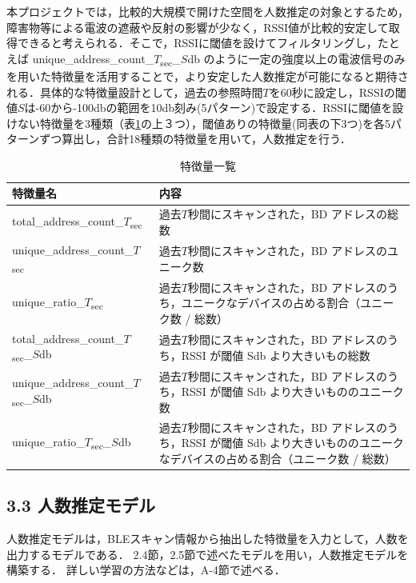 本プロジェクトでは，比較的大規模で開けた空間を人数推定の対象とするため，障害物等による電波の遮蔽や反射の影響が少なく，RSSI値が比較的安定して取得できると考えられる．そこで，RSSIに閾値を設けてフィルタリングし，たとえば unique\_address\_count\_$T$\textsubscript{sec}\_$S$db のように一定の強度以上の電波信号のみを用いた特徴量を活用することで，より安定した人数推定が可能になると期待される．具体的な特徴量設計として，過去の参照時間$T$を60秒に設定し，RSSIの閾値$S$は-60から-100dbの範囲を10db刻み(5パターン)で設定する．RSSIに閾値を設けない特徴量を3種類（表\ref{tbl:feastures}の上３つ），閾値ありの特徴量(同表の下3つ)を各5パターンずつ算出し，合計18種類の特徴量を用いて，人数推定を行う．

\begin{table}[tb]
	\centering
	\caption{特徴量一覧}
	\label{tbl:feastures}
	\small
	\doublerulesep=0.3pt
    \begin{tabular}{l|p{4cm}} \hline\hline\hline
		特徴量名 & 内容 \\ \hline
		total\_address\_count\_$T$\textsubscript{sec} & 過去$T$秒間にスキャンされた，BD アドレスの総数\\ \hline
		unique\_address\_count\_$T$\textsubscript{sec} & 過去$T$秒間にスキャンされた，BD アドレスのユニーク数 \\ \hline
		unique\_ratio\_$T$\textsubscript{sec} & 過去$T$秒間にスキャンされた，BD アドレスのうち，ユニークなデバイスの占める割合（ユニーク数 / 総数） \\ \hline
		total\_address\_count\_$T$\textsubscript{sec}\_$S$db & 過去$T$秒間にスキャンされた，BD アドレスのうち，RSSI が閾値 Sdb より大きいもの総数 \\ \hline
		unique\_address\_count\_$T$\textsubscript{sec}\_$S$db & 過去$T$秒間にスキャンされた，BD アドレスのうち，RSSI が閾値 Sdb より大きいもののユニーク数 \\ \hline
		unique\_ratio\_$T$\textsubscript{sec}\_$S$db &  過去$T$秒間にスキャンされた，BD アドレスのうち，RSSI が閾値 Sdb より大きいもののユニークなデバイスの占める割合（ユニーク数 / 総数） \\  \hline\hline\hline
	\end{tabular}
\end{table}

\subsection*{3.3 人数推定モデル}
人数推定モデルは，BLEスキャン情報から抽出した特徴量を入力として，人数を出力するモデルである．
2.4節，2.5節で述べたモデルを用い，人数推定モデルを構築する．
詳しい学習の方法などは，A-4節で述べる．

